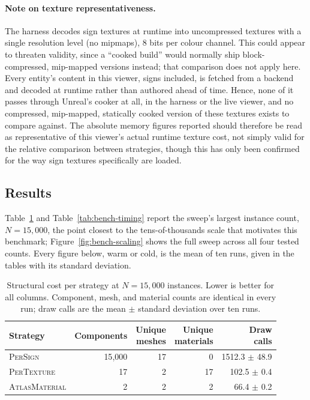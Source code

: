 \paragraph{Note on texture representativeness.} The harness decodes sign textures at runtime into uncompressed textures with a single resolution level (no mipmaps), 8 bits per colour channel. This could appear to threaten validity, since a ``cooked build'' would normally ship block-compressed, mip-mapped versions instead; that comparison does not apply here. Every entity's content in this viewer, signs included, is fetched from a backend and decoded at runtime rather than authored ahead of time. Hence, none of it passes through Unreal's cooker at all, in the harness or the live viewer, and no compressed, mip-mapped, statically cooked version of these textures exists to compare against. The absolute memory figures reported should therefore be read as representative of this viewer's actual runtime texture cost, not simply valid for the relative comparison between strategies, though this has only been confirmed for the way sign textures specifically are loaded.

\subsection{Results}
\label{sec:eval-results}

Table~\ref{tab:bench-structural} and Table~\ref{tab:bench-timing} report the sweep's largest instance count, \(N=15{,}000\), the point closest to the tens-of-thousands scale that motivates this benchmark; Figure~\ref{fig:bench-scaling} shows the full sweep across all four tested counts. Every figure below, warm or cold, is the mean of ten runs, given in the tables with its standard deviation.

\begin{table}[t]
  \centering
  \caption[Structural cost per strategy]{Structural cost per strategy at \(N=15{,}000\) instances. Lower is better for all columns. Component, mesh, and material counts are identical in every run; draw calls are the mean \(\pm\) standard deviation over ten runs.}
  \label{tab:bench-structural}
  \small
  \begin{tabular}{lrrrr}
    \hline
    Strategy & Components & \shortstack[r]{Unique\\meshes} & \shortstack[r]{Unique\\materials} & \shortstack[r]{Draw\\calls} \\
    \hline
    \textsc{PerSign}       & 15{,}000 & 17 & 0  & 1512.3 \(\pm\) 48.9 \\
    \textsc{PerTexture}    & 17       & 2  & 17 & 102.5 \(\pm\) 0.4 \\
    \textsc{AtlasMaterial} & 2        & 2  & 2  & 66.4 \(\pm\) 0.2 \\
    \hline
  \end{tabular}
\end{table}

